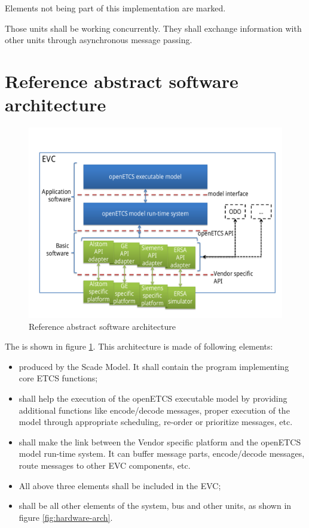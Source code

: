 \documentclass{template/openetcs_report}
\begin{document}
Elements not being part of this implementation are marked. 

Those units shall be working concurrently. They shall exchange information with other units through asynchronous message passing.

\section{Reference abstract software architecture}
\label{software-arch}

\begin{figure}[htbp]
  \centering
  \includegraphics[width=\linewidth]{software-architecture.pdf}
  \caption{Reference abstract software architecture}
  \label{fig:software-arch}
\end{figure}

The  is shown in figure
\ref{fig:software-arch}. This architecture is made of following
elements:
\begin{itemize}
\item {} produced by the
  \cite{scade-model} Scade Model. It shall contain the program implementing core
  ETCS functions;
\item{} shall help the execution
  of the openETCS executable model by providing additional functions
  like encode/decode messages, proper execution of the model through
  appropriate scheduling, re-order or prioritize messages, etc. 
\item {} shall make the link between
  the Vendor specific platform and the openETCS model run-time system.
  It can buffer message parts, encode/decode messages, route messages
  to other EVC components, etc.
\item All above three elements shall be included in the EVC;
\item {} shall be all other elements of
  the system, bus and other units, as shown in figure
  \ref{fig:hardware-arch}.
\end{itemize}
\end{document}
